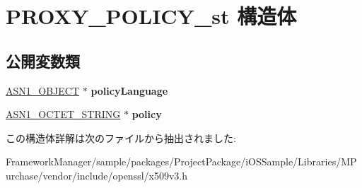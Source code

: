 \hypertarget{struct_p_r_o_x_y___p_o_l_i_c_y__st}{}\section{P\+R\+O\+X\+Y\+\_\+\+P\+O\+L\+I\+C\+Y\+\_\+st 構造体}
\label{struct_p_r_o_x_y___p_o_l_i_c_y__st}
\subsection*{公開変数類}
\begin{DoxyCompactItemize}
\item 
\hypertarget{struct_p_r_o_x_y___p_o_l_i_c_y__st_ab3fa64c1bd1d75d3433ec2c57ad2c764}{}\hyperlink{structasn1__object__st}{A\+S\+N1\+\_\+\+O\+B\+J\+E\+C\+T} $\ast$ {\bfseries policy\+Language}\label{struct_p_r_o_x_y___p_o_l_i_c_y__st_ab3fa64c1bd1d75d3433ec2c57ad2c764}

\item 
\hypertarget{struct_p_r_o_x_y___p_o_l_i_c_y__st_ac3360dfde3677ca63163277535db0dc2}{}\hyperlink{structasn1__string__st}{A\+S\+N1\+\_\+\+O\+C\+T\+E\+T\+\_\+\+S\+T\+R\+I\+N\+G} $\ast$ {\bfseries policy}\label{struct_p_r_o_x_y___p_o_l_i_c_y__st_ac3360dfde3677ca63163277535db0dc2}

\end{DoxyCompactItemize}


この構造体詳解は次のファイルから抽出されました\+:\begin{DoxyCompactItemize}
\item 
Framework\+Manager/sample/packages/\+Project\+Package/i\+O\+S\+Sample/\+Libraries/\+M\+Purchase/vendor/include/openssl/x509v3.\+h\end{DoxyCompactItemize}
